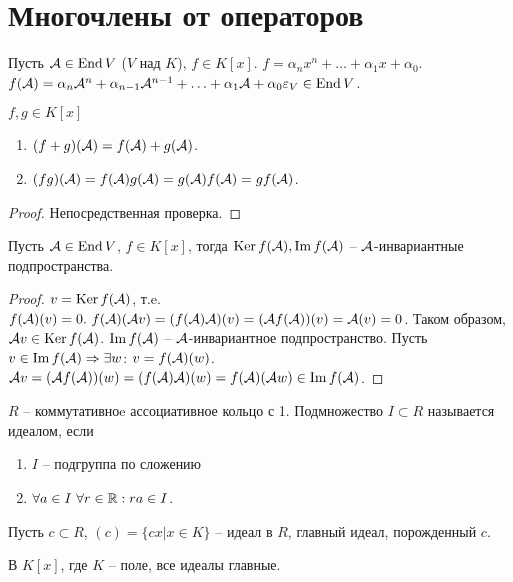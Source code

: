\documentclass[main]{subfiles}
\begin{document}
\chapter{Многочлены от операторов}

Пусть $\mathcal{A} \in \operatorname{End} V$ ($V$ над $K$), $f \in K[x]$. $f = \alpha_n x^n + \ldots + \alpha_1 x + \alpha_0$.
$f(\mathcal{A}) = \alpha_n {\mathcal{A}}^n + \alpha_{n-1} {\mathcal{A}}^{n-1} + \ldots + \alpha_1 \mathcal{A} + \alpha_0 \varepsilon_V \in \operatorname{End} V$.

\begin{proposition}
    $f, g \in K[x]$
    \begin{enumerate}
        \item $(f+g)(\mathcal{A}) = f(\mathcal{A}) + g(\mathcal{A})$.
        \item $(fg)(\mathcal{A}) = f(\mathcal{A})g(\mathcal{A}) =g(\mathcal{A})f(\mathcal{A})=gf(\mathcal{A})$.
    \end{enumerate}
\end{proposition}

\begin{proof}
    Непосредственная проверка.
\end{proof}

\begin{corollary}
    Пусть $\mathcal{A} \in \operatorname{End} V$, $f \in K[x]$, тогда $\operatorname{Ker} f(\mathcal{A}), \operatorname{Im} f(\mathcal{A})$ -- $\mathcal{A}$-инвариантные подпространства.
\end{corollary}

\begin{proof}
    $v = \operatorname{Ker} f(\mathcal{A})$, т.e. $f(\mathcal{A}) (v) = 0.\ f(\mathcal{A})(\mathcal{A} v) =
        (f(\mathcal{A})\mathcal{A})(v) = (\mathcal{A} f(\mathcal{A}))(v) = \mathcal{A}(v) = 0$.
    Таком образом, $\mathcal{A} v \in \operatorname{Ker} f(\mathcal{A})$. $\operatorname{Im} f(\mathcal{A})$ -- $\mathcal{A}$-инвариантное подпространство.
    Пусть $v \in \operatorname{Im} f(\mathcal{A}) \Rightarrow \exists w$: $v = f(\mathcal{A})(w)$.
    $\mathcal{A} v = (\mathcal{A} f(\mathcal{A}))(w) = (f(\mathcal{A})\mathcal{A})(w) = f(\mathcal{A})(\mathcal{A} w) \in \operatorname{Im} f(\mathcal{A})$.
\end{proof}

$R$ -- коммутативноe ассоциативное кольцо с 1. Подмножество $I\subset R$ называется идеалом, если
\begin{enumerate}
    \item $I$ -- подгруппа по сложению
    \item $\forall a \in I \ \forall r \in \mathbb{R} : ra \in I$.
\end{enumerate}

Пусть $c \subset R$, $(c) = \{cx | x \in K\}$ -- идеал в $R$, главный идеал, порожденный $c$.

\begin{corollary}
    В $K[x]$, где $K$ -- поле, все идеалы главные.
\end{corollary}
\end{document}

